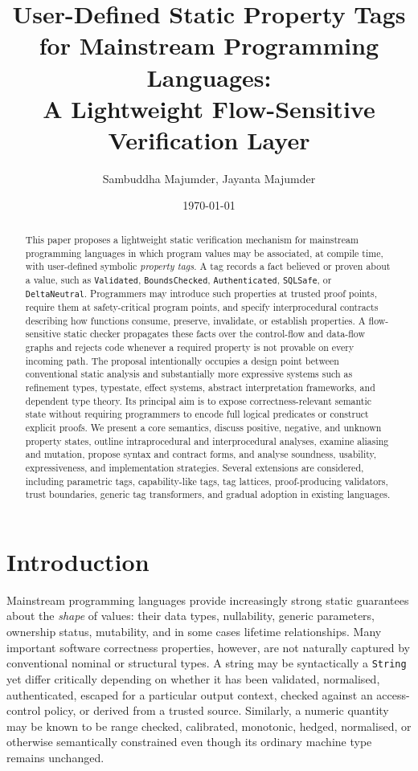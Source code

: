 \documentclass[11pt]{article}
\title{User-Defined Static Property Tags for Mainstream Programming Languages:\\
A Lightweight Flow-Sensitive Verification Layer}
\author{Sambuddha Majumder, Jayanta Majumder}
\date{\today}
\begin{document}
\maketitle

\begin{abstract}
This paper proposes a lightweight static verification mechanism for mainstream programming languages in which program values may be associated, at compile time, with user-defined symbolic \emph{property tags}. A tag records a fact believed or proven about a value, such as \texttt{Validated}, \texttt{BoundsChecked}, \texttt{Authenticated}, \texttt{SQLSafe}, or \texttt{DeltaNeutral}. Programmers may introduce such properties at trusted proof points, require them at safety-critical program points, and specify interprocedural contracts describing how functions consume, preserve, invalidate, or establish properties. A flow-sensitive static checker propagates these facts over the control-flow and data-flow graphs and rejects code whenever a required property is not provable on every incoming path. The proposal intentionally occupies a design point between conventional static analysis and substantially more expressive systems such as refinement types, typestate, effect systems, abstract interpretation frameworks, and dependent type theory. Its principal aim is to expose correctness-relevant semantic state without requiring programmers to encode full logical predicates or construct explicit proofs. We present a core semantics, discuss positive, negative, and unknown property states, outline intraprocedural and interprocedural analyses, examine aliasing and mutation, propose syntax and contract forms, and analyse soundness, usability, expressiveness, and implementation strategies. Several extensions are considered, including parametric tags, capability-like tags, tag lattices, proof-producing validators, trust boundaries, generic tag transformers, and gradual adoption in existing languages.
\end{abstract}

\section{Introduction}
Mainstream programming languages provide increasingly strong static guarantees about the \emph{shape} of values: their data types, nullability, generic parameters, ownership status, mutability, and in some cases lifetime relationships. Many important software correctness properties, however, are not naturally captured by conventional nominal or structural types. A string may be syntactically a \texttt{String} yet differ critically depending on whether it has been validated, normalised, authenticated, escaped for a particular output context, checked against an access-control policy, or derived from a trusted source. Similarly, a numeric quantity may be known to be range checked, calibrated, monotonic, hedged, normalised, or otherwise semantically constrained even though its ordinary machine type remains unchanged.
\end{document}

